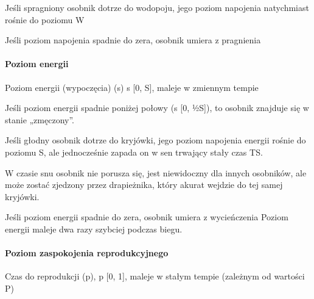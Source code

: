 \begin{DoxyItemize}
\item Jeśli spragniony osobnik dotrze do wodopoju, jego poziom napojenia natychmiast rośnie do poziomu W
\end{DoxyItemize}


\begin{DoxyItemize}
\item Jeśli poziom napojenia spadnie do zera, osobnik umiera z pragnienia
\end{DoxyItemize}

\paragraph*{Poziom energii}

Poziom energii (wypoczęcia) (s) s  \mbox{[}0, S\mbox{]}, maleje w zmiennym tempie


\begin{DoxyItemize}
\item Jeśli poziom energii spadnie poniżej połowy (s  \mbox{[}0, ½\-S\mbox{]}), to osobnik znajduje się w stanie „zmęczony”.
\end{DoxyItemize}


\begin{DoxyItemize}
\item Jeśli głodny osobnik dotrze do kryjówki, jego poziom napojenia energii rośnie do poziomu S, ale jednocześnie zapada on w sen trwający stały czas T\-S.
\end{DoxyItemize}


\begin{DoxyItemize}
\item W czasie snu osobnik nie porusza się, jest niewidoczny dla innych osobników, ale może zostać zjedzony przez drapieżnika, który akurat wejdzie do tej samej kryjówki.
\end{DoxyItemize}


\begin{DoxyItemize}
\item Jeśli poziom energii spadnie do zera, osobnik umiera z wycieńczenia Poziom energii maleje dwa razy szybciej podczas biegu.
\end{DoxyItemize}

\paragraph*{Poziom zaspokojenia reprodukcyjnego}

Czas do reprodukcji (p), p  \mbox{[}0, 1\mbox{]}, maleje w stałym tempie (zależnym od wartości P)


